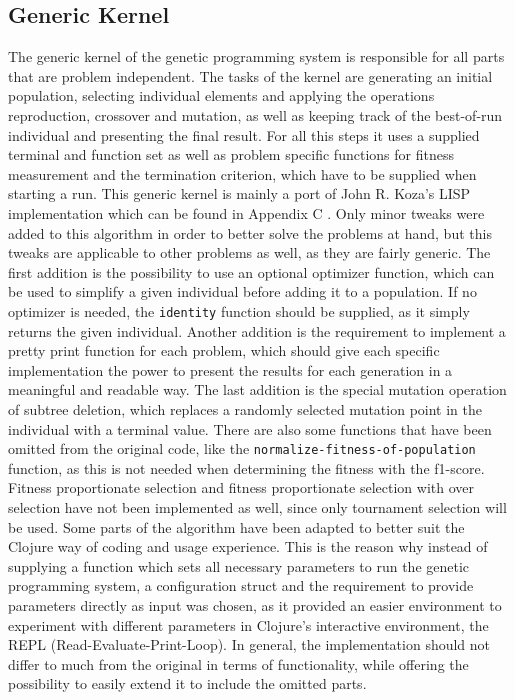 \documentclass[runningheads]{llncs}
\begin{document}
\subsection{Generic Kernel}
The generic kernel of the genetic programming system is responsible for all parts that are problem independent. The tasks of the kernel are generating an initial population, selecting individual elements and applying the operations reproduction, crossover and mutation, as well as keeping track of the best-of-run individual and presenting the final result. For all this steps it uses a supplied terminal and function set as well as problem specific functions for fitness measurement and the termination criterion, which have to be supplied when starting a run. This generic kernel is mainly a port of John R. Koza's LISP implementation which can be found in Appendix C \cite[735-755]{gp1-1993}. Only minor tweaks were added to this algorithm in order to better solve the problems at hand, but this tweaks are applicable to other problems as well, as they are fairly generic. The first addition is the possibility to use an optional optimizer function, which can be used to simplify a given individual before adding it to a population. If no optimizer is needed, the \texttt{identity} function should be supplied, as it simply returns the given individual. Another addition is the requirement to implement a pretty print function for each problem, which should give each specific implementation the power to present the results for each generation in a meaningful and readable way. The last addition is the special mutation operation of subtree deletion, which replaces a randomly selected mutation point in the individual with a terminal value.
There are also some functions that have been omitted from the original code, like the \texttt{normalize-fitness-of-population} function, as this is not needed when determining the fitness with the f1-score. Fitness proportionate selection and fitness proportionate selection with over selection have not been implemented as well, since only tournament selection will be used. Some parts of the algorithm have been adapted to better suit the Clojure way of coding and usage experience. This is the reason why instead of supplying a function which sets all necessary parameters to run the genetic programming system, a configuration struct and the requirement to provide parameters directly as input was chosen, as it provided an easier environment to experiment with different parameters in Clojure's interactive environment, the REPL (Read-Evaluate-Print-Loop). In general, the implementation should not differ to much from the original in terms of functionality, while offering the possibility to easily extend it to include the omitted parts.
\end{document}
